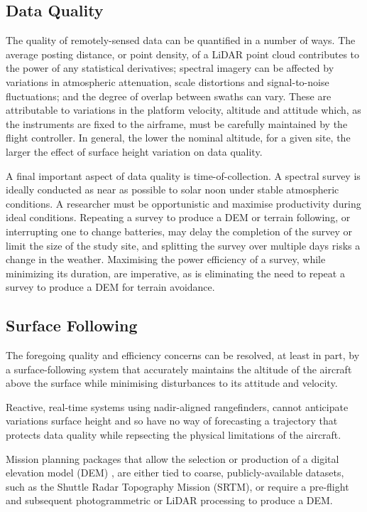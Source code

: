 \documentclass[doc]{apa6}
\begin{document}
\subsection{Data Quality}

The quality of remotely-sensed data can be quantified in a number of ways. The average posting distance, or point density, of a LiDAR point cloud contributes to the power of any statistical derivatives; spectral imagery can be affected by variations in atmospheric attenuation, scale distortions and signal-to-noise fluctuations; and the degree of overlap between swaths can vary. These are attributable to variations in the platform velocity, altitude and attitude which, as the instruments are fixed to the airframe, must be carefully maintained by the flight controller. In general, the lower the nominal altitude, for a given site, the larger the effect of surface height variation on data quality.

A final important aspect of data quality is time-of-collection. A spectral survey is ideally conducted as near as possible to solar noon under stable atmospheric conditions. A researcher must be opportunistic and maximise productivity during ideal conditions. Repeating a survey to produce a DEM or terrain following, or interrupting one to change batteries, may delay the completion of the survey or limit the size of the study site, and splitting the survey over multiple days risks a change in the weather. Maximising the power efficiency of a survey, while minimizing its duration, are imperative, as is eliminating the need to repeat a survey to produce a DEM for terrain avoidance.


\subsection{Surface Following}

The foregoing quality and efficiency concerns can be resolved, at least in part, by a surface-following system that accurately maintains the altitude of the aircraft above the surface while minimising disturbances to its attitude and velocity. 

Reactive, real-time systems using nadir-aligned rangefinders, cannot anticipate variations surface height and so have no way of forecasting a trajectory that protects data quality while repsecting the physical limitations of the aircraft.

Mission planning packages that allow the selection or production of a digital elevation model (DEM) \parencite[e.g.,][]{PrecisionHawk2018,UgCS2018,MapsMadeEasy2018}, are either tied to coarse, publicly-available datasets, such as the Shuttle Radar Topography Mission (SRTM), or require a pre-flight and subsequent photogrammetric or LiDAR processing to produce a DEM. 
\end{document}
